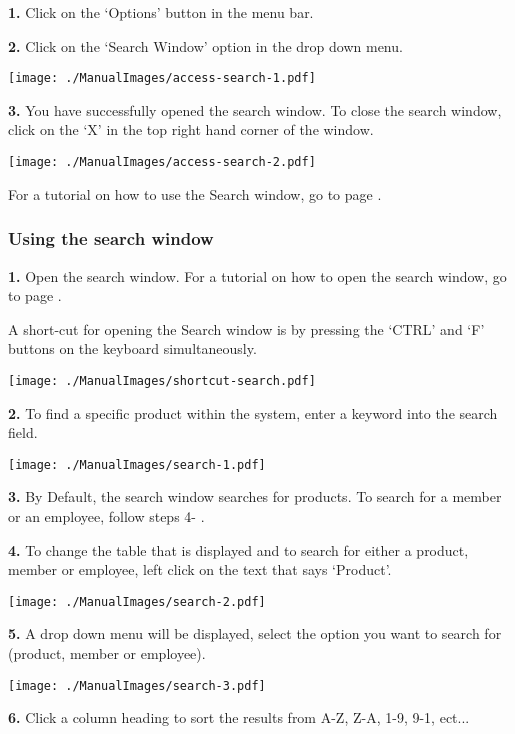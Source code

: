 \textbf{1.} Click on the `Options' button in the menu bar.

\textbf{2.} Click on the `Search Window' option in the drop down menu.

\texttt{[image: ./ManualImages/access-search-1.pdf]}

\pagebreak

\textbf{3.} You have successfully opened the search window. To close the search window, click on the `X' in the top right hand corner of the window.

\texttt{[image: ./ManualImages/access-search-2.pdf]}

For a tutorial on how to use the Search window, go to page \pageref{fig:Using the search window}.


\pagebreak
\subsubsection{Using the search window}
\label{fig:Using the search window}

\textbf{1.} Open the search window. For a tutorial on how to open the search window, go to page \pageref{fig:Accessing the search window}.

A short-cut for opening the Search window is by pressing the `CTRL' and `F' buttons on the keyboard simultaneously.

\texttt{[image: ./ManualImages/shortcut-search.pdf]}

\textbf{2.} To find a specific product within the system, enter a keyword into the search field.

\texttt{[image: ./ManualImages/search-1.pdf]}

\textbf{3.} By Default, the search window searches for products. To search for a member or an employee, follow steps 4- .

\textbf{4.} To change the table that is displayed and to search for either a product, member or employee, left click on the text that says `Product'.

\texttt{[image: ./ManualImages/search-2.pdf]}

\textbf{5.} A drop down menu will be displayed, select the option you want to search for (product, member or employee).

\texttt{[image: ./ManualImages/search-3.pdf]}

\textbf{6.} Click a column heading to sort the results from A-Z, Z-A, 1-9, 9-1, ect...


